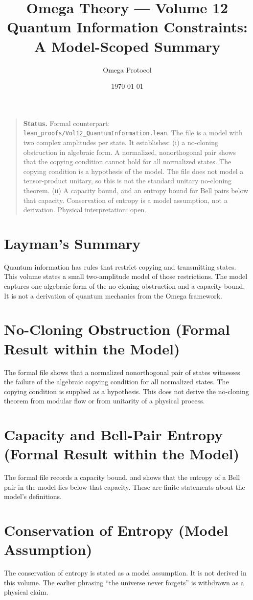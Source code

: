 \documentclass[11pt, a4paper]{article}
\title{Omega Theory --- Volume 12\\\Large Quantum Information Constraints: A Model-Scoped Summary}
\author{Omega Protocol}
\date{\today}
\begin{document}
\maketitle

\begin{quote}
\textbf{Status.} Formal counterpart: \texttt{lean\_proofs/Vol12\_QuantumInformation.lean}. The file is a model with two complex amplitudes per state. It establishes: (i) a no-cloning obstruction in algebraic form. A normalized, nonorthogonal pair shows that the copying condition cannot hold for all normalized states. The copying condition is a hypothesis of the model. The file does not model a tensor-product unitary, so this is not the standard unitary no-cloning theorem. (ii) A capacity bound, and an entropy bound for Bell pairs below that capacity. Conservation of entropy is a model assumption, not a derivation. Physical interpretation: open.
\end{quote}

\section*{Layman's Summary}
Quantum information has rules that restrict copying and transmitting states. This volume states a small two-amplitude model of those restrictions. The model captures one algebraic form of the no-cloning obstruction and a capacity bound. It is not a derivation of quantum mechanics from the Omega framework.

\section{No-Cloning Obstruction (Formal Result within the Model)}
The formal file shows that a normalized nonorthogonal pair of states witnesses the failure of the algebraic copying condition for all normalized states. The copying condition is supplied as a hypothesis. This does not derive the no-cloning theorem from modular flow or from unitarity of a physical process.

\section{Capacity and Bell-Pair Entropy (Formal Result within the Model)}
The formal file records a capacity bound, and shows that the entropy of a Bell pair in the model lies below that capacity. These are finite statements about the model's definitions.

\section{Conservation of Entropy (Model Assumption)}
The conservation of entropy is stated as a model assumption. It is not derived in this volume. The earlier phrasing ``the universe never forgets'' is withdrawn as a physical claim.
\end{document}
